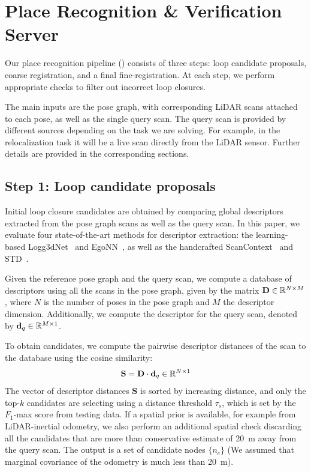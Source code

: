 \section{Place Recognition \& Verification Server} \label{sec:pipeline}
Our place recognition pipeline () consists of three steps: loop candidate proposals, coarse registration, and a final fine-registration. At each step, we perform appropriate checks to filter out incorrect loop closures.

The main inputs are the pose graph, with corresponding LiDAR scans attached to each pose, as well as the single query scan. The query scan is provided by different sources depending on the task we are solving. For example, in the relocalization task it will be a live scan directly from the LiDAR sensor. Further details are provided in the corresponding sections.

\subsection*{\textbf{Step 1: Loop candidate proposals}}
\label{subsubsec:loop-candidate}
Initial loop closure candidates are obtained by comparing global descriptors extracted from the pose graph scans as well as the query scan. In this paper, we evaluate four state-of-the-art methods for descriptor extraction: the learning-based Logg3dNet~\cite{vidanapathirana2022icra} and EgoNN~\cite{komorowski2022ral}, as well as the handcrafted ScanContext~\cite{kim2018iros} and STD~\cite{yuan2023icra}.

Given the reference pose graph and the query scan, we compute a database of descriptors using all the scans in the pose graph, given by the matrix $\mathbf{D} \in \mathbb{R}^{N\times M}$, where $N$ is the number of poses in the pose graph and $M$ the descriptor dimension. Additionally, we compute the descriptor for the query scan, denoted by $\mathbf{d}_{q} \in \mathbb{R}^{M \times 1}$. 

To obtain candidates, we compute the pairwise descriptor distances of the scan to the database using the cosine similarity:
\begin{equation}
  \mathbf{S} = \mathbf{D} \cdot \mathbf{d}_{q} \in \mathbb{R}^{N \times 1}
\end{equation}
The vector of descriptor distances $\mathbf{S}$ is sorted by increasing distance, and only the top-$k$ candidates are selecting using a distance threshold $\tau_{s}$, which is set by the $F_1$-max score from testing data.
If a spatial prior is available, for example from LiDAR-inertial odometry, we also perform an additional spatial check discarding all the candidates that are more than conservative estimate of \SI{20}{\meter} away from the query scan. The output is a set of candidate nodes $\{ n_c\}$ (We assumed that marginal covariance of the odometry is much less than \SI{20}{\meter}).


